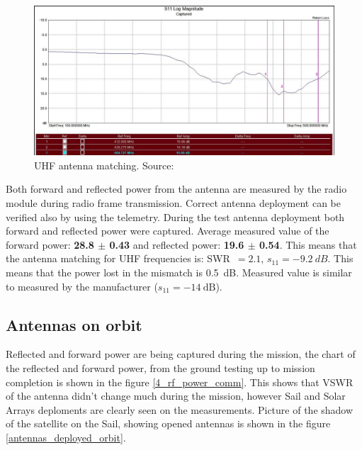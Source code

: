\begin{figure}[H]
    \centering
    \includegraphics[width=0.8\paperwidth]{img/6/isis_s11_uhf.png}
    \caption{UHF antenna matching. Source: \cite{isis_ant_test_report}}
    \label{isis_s11_uhf}
\end{figure}

\newpage

Both forward and reflected power from the antenna are measured by the radio module during radio frame transmission. Correct antenna deployment can be verified also by using the telemetry. During the test antenna deployment both forward and reflected power were captured. Average measured value of the forward power: \textbf{\SI{28.8}{\dBm} $\pm$ \SI{0.43}{\dBm}} and reflected power: \textbf{\SI{19.6}{\dBm} $\pm$ \SI{0.54}{\dBm}}. This means that the antenna matching for UHF frequencies is: SWR~$= 2.1$, $s_{11} = -9.2~dB$. This means that the power lost in the mismatch is \SI{0.5}{\dB}. Measured value is similar to measured by the manufacturer ($s_{11} = \SI{-14}{\dB}$).

\subsection{Antennas on orbit}
Reflected and forward power are being captured during the mission, the chart of the reflected and forward power, from the ground testing up to mission completion is shown in the figure \ref{4_rf_power_comm}. This shows that VSWR of the antenna didn't change much during the mission, however Sail and Solar Arrays deploments are clearly seen on the measurements. Picture of the shadow of the satellite on the Sail, showing opened antennas is shown in the figure \ref{antennas_deployed_orbit}.

